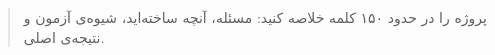 \documentclass[11pt,a4paper]{article}
\begin{document}
\atlmaketitle                             %

\atlfrontmatter                           %
\begin{abstract}
پروژه را در حدود ۱۵۰ کلمه خلاصه کنید: مسئله، آنچه ساخته‌اید، شیوه‌ی آزمون و نتیجه‌ی اصلی.
\end{abstract}
\tableofcontents

\atlmainmatter                            %








\atlappendix

\end{document}
